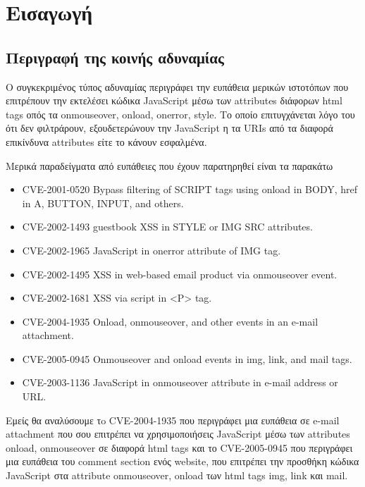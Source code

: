 %
%
\setcounter{chapter}{1}
\section{Εισαγωγή}
\subsection{Περιγραφή της κοινής αδυναμίας}
\noindent
Ο συγκεκριμένος τύπος αδυναμίας περιγράφει την ευπάθεια μερικών ιστοτόπων που επιτρέπουν την εκτελέσει κώδικα JavaScript μέσω των attributes διάφορων html tags οπός τα onmouseover, onload,  onerror, style. Το οποίο επιτυγχάνεται λόγο του ότι δεν φιλτράρουν, εξουδετερώνουν την JavaScript η τα URIs από τα διαφορά επικίνδυνα attributes είτε το κάνουν εσφαλμένα.

\noindent
Μερικά παραδείγματα από ευπάθειες που έχουν παρατηρηθεί είναι τα παρακάτω

\begin{itemize}
	\item CVE-2001-0520 Bypass filtering of SCRIPT tags using onload in BODY, href in A, BUTTON, INPUT, and others.
	\item CVE-2002-1493 guestbook XSS in STYLE or IMG SRC attributes. 
	\item CVE-2002-1965 JavaScript in onerror attribute of IMG tag. 
	\item CVE-2002-1495 XSS in web-based email product via onmouseover event. 
	\item CVE-2002-1681 XSS via script in <P> tag. 
	\item CVE-2004-1935 Onload, onmouseover, and other events in an e-mail attachment. 
	\item CVE-2005-0945 Onmouseover and onload events in img, link, and mail tags. 
	\item CVE-2003-1136 JavaScript in onmouseover attribute in e-mail address or URL. 
	
\end{itemize}

\noindent
Εμείς θα αναλύσουμε τo CVE-2004-1935 που περιγράφει μια ευπάθεια σε e-mail attachment που σου επιτρέπει να χρησιμοποιήσεις JavaScript μέσω των attributes onload, onmouseover σε διαφορά html tags και το CVE-2005-0945 που περιγράφει μια ευπάθεια του comment section ενός website, που επιτρέπει την προσθήκη κώδικα JavaScript στα attribute onmouseover, onload των html tags img, link και mail.
